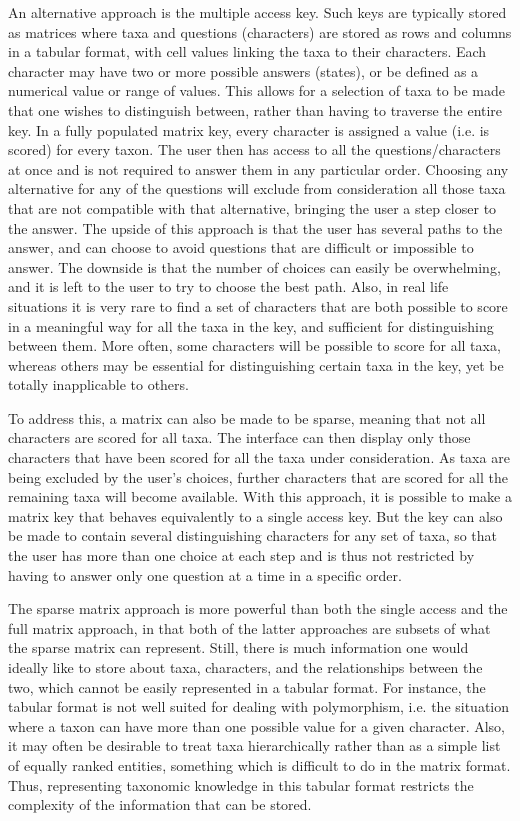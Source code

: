 \documentclass[10pt,letterpaper]{article}
\begin{document}
An alternative approach is the multiple access key. Such keys are typically stored as matrices where taxa and questions (characters) are stored as rows and columns in a tabular format, with cell values linking the taxa to their characters. Each character may have two or more possible answers (states), or be defined as a numerical value or range of values. This allows for a selection of taxa to be made that one wishes to distinguish between, rather than having to traverse the entire key. In a fully populated matrix key, every character is assigned a value (i.e. is scored) for every taxon. The user then has access to all the questions/characters at once and is not required to answer them in any particular order. Choosing any alternative for any of the questions will exclude from consideration all those taxa that are not compatible with that alternative, bringing the user a step closer to the answer. The upside of this approach is that the user has several paths to the answer, and can choose to avoid questions that are difficult or impossible to answer. The downside is that the number of choices can easily be overwhelming, and it is left to the user to try to choose the best path. Also, in real life situations it is very rare to find a set of characters that are both possible to score in a meaningful way for all the taxa in the key, and sufficient for distinguishing between them. More often, some characters will be possible to score for all taxa, whereas others may be essential for distinguishing certain taxa in the key, yet be totally inapplicable to others.

To address this, a matrix can also be made to be sparse, meaning that not all characters are scored for all taxa. The interface can then display only those characters that have been scored for all the taxa under consideration. As taxa are being excluded by the user’s choices, further characters that are scored for all the remaining taxa will become available. With this approach, it is possible to make a matrix key that behaves equivalently to a single access key. But the key can also be made to contain several distinguishing characters for any set of taxa, so that the user has more than one choice at each step and is thus not restricted by having to answer only one question at a time in a specific order.

The sparse matrix approach is more powerful than both the single access and the full matrix approach, in that both of the latter approaches are subsets of what the sparse matrix can represent. Still, there is much information one would ideally like to store about taxa, characters, and the relationships between the two, which cannot be easily represented in a tabular format. For instance, the tabular format is not well suited for dealing with polymorphism, i.e. the situation where a taxon can have more than one possible value for a given character. Also, it may often be desirable to treat taxa hierarchically rather than as a simple list of equally ranked entities, something which is difficult to do in the matrix format. Thus, representing taxonomic knowledge in this tabular format restricts the complexity of the information that can be stored.
\end{document}
